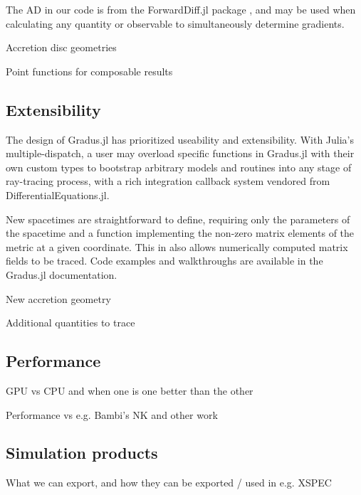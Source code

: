 The AD in our code is from the ForwardDiff.jl package \citep{RevelsLubinPapamarkou2016}, and may be used when calculating any quantity or observable to simultaneously determine gradients.

Accretion disc geometries

Point functions for composable results

\subsection{Extensibility}

The design of Gradus.jl has prioritized useability and extensibility. With Julia's multiple-dispatch, a user may overload specific functions in Gradus.jl with their own custom types to bootstrap arbitrary models and routines into any stage of ray-tracing process, with a rich integration callback system vendored from DifferentialEquations.jl.

New spacetimes are straightforward to define, requiring only the parameters of the spacetime and a function implementing the non-zero matrix elements of the metric at a given coordinate. This in also allows numerically computed matrix fields to be traced. Code examples and walkthroughs are available in the Gradus.jl documentation.

New accretion geometry

Additional quantities to trace

\subsection{Performance}

GPU vs CPU and when one is one better than the other

Performance vs e.g. Bambi's NK and other work

\subsection{Simulation products}

What we can export, and how they can be exported / used in e.g. XSPEC

